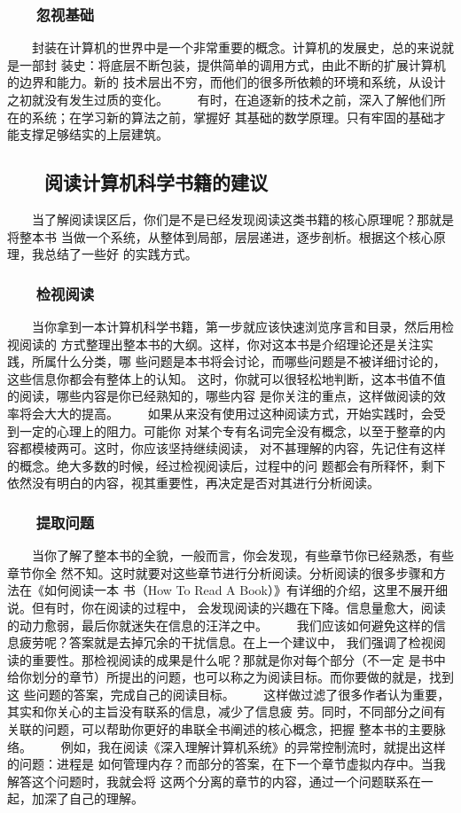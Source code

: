 \documentclass[11pt]{ctexart}
\begin{document}
{{{{\subsubsection{　　忽视基础}
\label{sec:org711f5e6}
　　封装在计算机的世界中是一个非常重要的概念。计算机的发展史，总的来说就是一部封
装史：将底层不断包装，提供简单的调用方式，由此不断的扩展计算机的边界和能力。新的
技术层出不穷，而他们的很多所依赖的环境和系统，从设计之初就没有发生过质的变化。
　　有时，在追逐新的技术之前，深入了解他们所在的系统；在学习新的算法之前，掌握好
其基础的数学原理。只有牢固的基础才能支撑足够结实的上层建筑。
\subsection{　　阅读计算机科学书籍的建议}
\label{sec:org20a043d}
　　当了解阅读误区后，你们是不是已经发现阅读这类书籍的核心原理呢？那就是将整本书
当做一个系统，从整体到局部，层层递进，逐步剖析。根据这个核心原理，我总结了一些好
的实践方式。
\subsubsection{　　检视阅读}
\label{sec:org8656ac4}
　　当你拿到一本计算机科学书籍，第一步就应该快速浏览序言和目录，然后用检视阅读的
方式整理出整本书的大纲。这样，你对这本书是介绍理论还是关注实践，所属什么分类，哪
些问题是本书将会讨论，而哪些问题是不被详细讨论的，这些信息你都会有整体上的认知。
这时，你就可以很轻松地判断，这本书值不值的阅读，哪些内容是你已经熟知的，哪些内容
是你关注的重点，这样做阅读的效率将会大大的提高。
　　如果从来没有使用过这种阅读方式，开始实践时，会受到一定的心理上的阻力。可能你
对某个专有名词完全没有概念，以至于整章的内容都模棱两可。这时，你应该坚持继续阅读，
对不甚理解的内容，先记住有这样的概念。绝大多数的时候，经过检视阅读后，过程中的问
题都会有所释怀，剩下依然没有明白的内容，视其重要性，再决定是否对其进行分析阅读。
\subsubsection{　　提取问题}
\label{sec:org1bca79d}

　　当你了解了整本书的全貌，一般而言，你会发现，有些章节你已经熟悉，有些章节你全
然不知。这时就要对这些章节进行分析阅读。分析阅读的很多步骤和方法在《如何阅读一本
书（How To Read A Book）》有详细的介绍，这里不展开细说。但有时，你在阅读的过程中，
会发现阅读的兴趣在下降。信息量愈大，阅读的动力愈弱，最后你就迷失在信息的汪洋之中。
　　我们应该如何避免这样的信息疲劳呢？答案就是去掉冗余的干扰信息。在上一个建议中，
我们强调了检视阅读的重要性。那检视阅读的成果是什么呢？那就是你对每个部分（不一定
是书中给你划分的章节）所提出的问题，也可以称之为阅读目标。而你要做的就是，找到这
些问题的答案，完成自己的阅读目标。
　　这样做过滤了很多作者认为重要，其实和你关心的主旨没有联系的信息，减少了信息疲
劳。同时，不同部分之间有关联的问题，可以帮助你更好的串联全书阐述的核心概念，把握
整本书的主要脉络。
　　例如，我在阅读《深入理解计算机系统》的异常控制流时，就提出这样的问题：进程是
如何管理内存？而部分的答案，在下一个章节虚拟内存中。当我解答这个问题时，我就会将
这两个分离的章节的内容，通过一个问题联系在一起，加深了自己的理解。
}}}}
\end{document}
